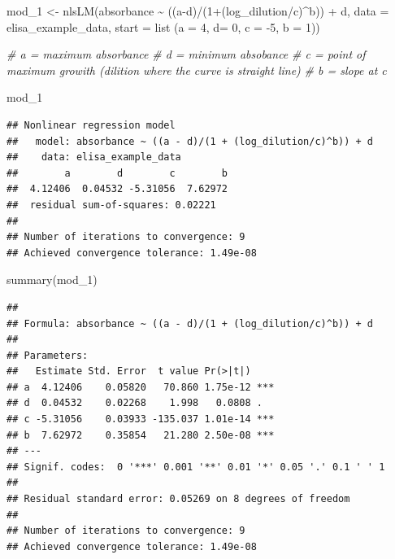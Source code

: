 \documentclass[
]{book}
\newenvironment{Shaded}{\begin{snugshade}}{\end{snugshade}}
\newcommand{\AttributeTok}[1]{\textcolor[rgb]{0.77,0.63,0.00}{#1}}
\newcommand{\CommentTok}[1]{\textcolor[rgb]{0.56,0.35,0.01}{\textit{#1}}}
\newcommand{\DecValTok}[1]{\textcolor[rgb]{0.00,0.00,0.81}{#1}}
\newcommand{\FunctionTok}[1]{\textcolor[rgb]{0.00,0.00,0.00}{#1}}
\newcommand{\NormalTok}[1]{#1}
\newcommand{\OtherTok}[1]{\textcolor[rgb]{0.56,0.35,0.01}{#1}}
\newcommand{\SpecialCharTok}[1]{\textcolor[rgb]{0.00,0.00,0.00}{#1}}
\begin{document}
\begin{Shaded}
\begin{Highlighting}[]
\NormalTok{mod\_1 }\OtherTok{\textless{}{-}} \FunctionTok{nlsLM}\NormalTok{(absorbance }\SpecialCharTok{\textasciitilde{}}\NormalTok{ ((a}\SpecialCharTok{{-}}\NormalTok{d)}\SpecialCharTok{/}\NormalTok{(}\DecValTok{1}\SpecialCharTok{+}\NormalTok{(log\_dilution}\SpecialCharTok{/}\NormalTok{c)}\SpecialCharTok{\^{}}\NormalTok{b)) }\SpecialCharTok{+}\NormalTok{ d,}
\AttributeTok{data =}\NormalTok{ elisa\_example\_data, }
\AttributeTok{start =} \FunctionTok{list}\NormalTok{ (}\AttributeTok{a =} \DecValTok{4}\NormalTok{, }\AttributeTok{d=} \DecValTok{0}\NormalTok{, }\AttributeTok{c =} \SpecialCharTok{{-}}\DecValTok{5}\NormalTok{, }\AttributeTok{b =} \DecValTok{1}\NormalTok{))}

\CommentTok{\# a = maximum absorbance}
\CommentTok{\# d = minimum absobance}
\CommentTok{\# c = point of maximum growith (dilition where the curve is straight line)}
\CommentTok{\# b = slope at c}

\NormalTok{mod\_1}
\end{Highlighting}
\end{Shaded}

\begin{verbatim}
## Nonlinear regression model
##   model: absorbance ~ ((a - d)/(1 + (log_dilution/c)^b)) + d
##    data: elisa_example_data
##        a        d        c        b 
##  4.12406  0.04532 -5.31056  7.62972 
##  residual sum-of-squares: 0.02221
## 
## Number of iterations to convergence: 9 
## Achieved convergence tolerance: 1.49e-08
\end{verbatim}

\begin{Shaded}
\begin{Highlighting}[]
\FunctionTok{summary}\NormalTok{(mod\_1)}
\end{Highlighting}
\end{Shaded}

\begin{verbatim}
## 
## Formula: absorbance ~ ((a - d)/(1 + (log_dilution/c)^b)) + d
## 
## Parameters:
##   Estimate Std. Error  t value Pr(>|t|)    
## a  4.12406    0.05820   70.860 1.75e-12 ***
## d  0.04532    0.02268    1.998   0.0808 .  
## c -5.31056    0.03933 -135.037 1.01e-14 ***
## b  7.62972    0.35854   21.280 2.50e-08 ***
## ---
## Signif. codes:  0 '***' 0.001 '**' 0.01 '*' 0.05 '.' 0.1 ' ' 1
## 
## Residual standard error: 0.05269 on 8 degrees of freedom
## 
## Number of iterations to convergence: 9 
## Achieved convergence tolerance: 1.49e-08
\end{verbatim}
\end{document}

